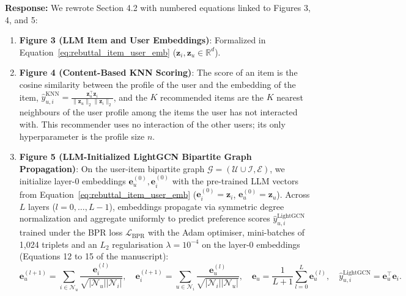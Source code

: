\documentclass[11pt,a4paper]{article}
\newcommand{\mm}[1]{#1}
\begin{document}
\noindent\textbf{Response:}
We rewrote Section 4.2 with numbered equations linked to Figures 3, 4, and 5:
\begin{enumerate}
    \item \textbf{Figure 3 (LLM Item and User Embeddings)}: Formalized in Equation~\ref{eq:rebuttal_item_user_emb} ($\mm{\mathbf{z}_i, \mathbf{z}_u} \in \mathbb{R}^d$).
    \item \textbf{Figure 4 (\mm{Content-Based} KNN Scoring)}: \mm{The score of an item is the cosine similarity between the profile of the user and the embedding of the item, $\hat{y}_{u,i}^{\text{KNN}} = \frac{\mathbf{z}_u^\top \mathbf{z}_i}{\|\mathbf{z}_u\|_2 \|\mathbf{z}_i\|_2}$, and the $K$ recommended items are the $K$ nearest neighbours of the user profile among the items the user has not interacted with. This recommender uses no interaction of the other users; its only hyperparameter is the profile size $n$.}
    \item \textbf{Figure 5 (LLM-Initialized LightGCN Bipartite Graph Propagation)}: On the user-item bipartite graph $\mathcal{G} = (\mathcal{U} \cup \mathcal{I}, \mathcal{E})$, we initialize layer-0 embeddings $\mathbf{e}_u^{(0)}, \mathbf{e}_i^{(0)}$ with the pre-trained LLM vectors from Equation~\ref{eq:rebuttal_item_user_emb} \mm{($\mathbf{e}_i^{(0)} = \mathbf{z}_i$, $\mathbf{e}_u^{(0)} = \mathbf{z}_u$)}. Across $L$ layers ($l = 0, \dots, L-1$), embeddings propagate via symmetric degree normalization and aggregate uniformly to predict preference scores $\hat{y}_{u,i}^{\text{LightGCN}}$ trained under the BPR loss $\mathcal{L}_{\text{BPR}}$ \mm{with the Adam optimiser, mini-batches of 1,024 triplets and an $L_2$ regularisation $\lambda = 10^{-4}$ on the layer-0 embeddings (Equations 12 to 15 of the manuscript)}:
    \begin{equation}
    \mathbf{e}_u^{(l+1)} = \sum_{i \in \mathcal{N}_u} \frac{\mathbf{e}_i^{(l)}}{\sqrt{|\mathcal{N}_u||\mathcal{N}_i|}}, \quad
    \mathbf{e}_i^{(l+1)} = \sum_{u \in \mathcal{N}_i} \frac{\mathbf{e}_u^{(l)}}{\sqrt{|\mathcal{N}_i||\mathcal{N}_u|}}, \quad
    \mathbf{e}_u = \frac{1}{L + 1} \sum_{l=0}^{L} \mathbf{e}_u^{(l)}, \quad
    \hat{y}_{u,i}^{\text{LightGCN}} = \mathbf{e}_u^\top \mathbf{e}_i.
    \label{eq:rebuttal_lightgcn_all}
    \end{equation}
\end{enumerate}
\end{document}
